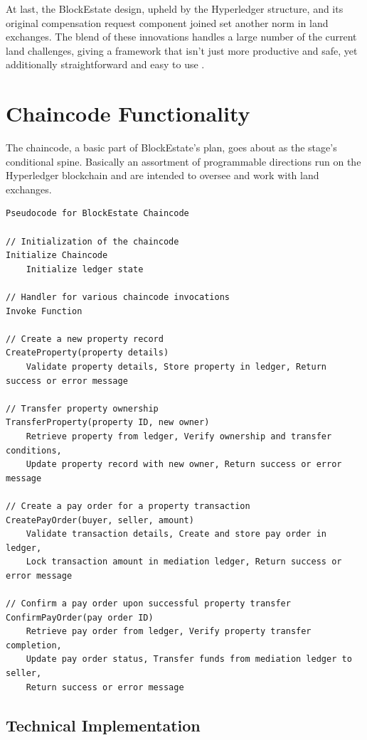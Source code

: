 \documentclass[3p,times]{elsarticle}
\begin{document}
At last, the BlockEstate design, upheld by the Hyperledger structure, and its original compensation request component joined set another norm in land exchanges. The blend of these innovations handles a large number of the current land challenges, giving a framework that isn't just more productive and safe, yet additionally straightforward and easy to use \cite{harris2021blockchain}.

\section{Chaincode Functionality}

The chaincode, a basic part of BlockEstate's plan, goes about as the stage's conditional spine. Basically an assortment of programmable directions run on the Hyperledger blockchain and are intended to oversee and work with land exchanges.

\begin{verbatim}
Pseudocode for BlockEstate Chaincode

// Initialization of the chaincode
Initialize Chaincode
    Initialize ledger state

// Handler for various chaincode invocations
Invoke Function

// Create a new property record
CreateProperty(property details)
    Validate property details, Store property in ledger, Return success or error message

// Transfer property ownership
TransferProperty(property ID, new owner)
    Retrieve property from ledger, Verify ownership and transfer conditions, 
    Update property record with new owner, Return success or error message

// Create a pay order for a property transaction
CreatePayOrder(buyer, seller, amount)
    Validate transaction details, Create and store pay order in ledger, 
    Lock transaction amount in mediation ledger, Return success or error message

// Confirm a pay order upon successful property transfer
ConfirmPayOrder(pay order ID)
    Retrieve pay order from ledger, Verify property transfer completion,
    Update pay order status, Transfer funds from mediation ledger to seller, 
    Return success or error message

\end{verbatim}

\subsection{Technical Implementation}
\end{document}
